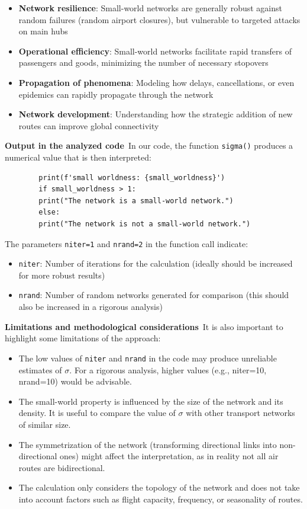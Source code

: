 \documentclass[12pt]{article}
\begin{document}
        \begin{itemize}
        \item \textbf{Network resilience}: Small-world networks are generally robust against random failures (random airport closures), but vulnerable to targeted attacks on main hubs
        \item \textbf{Operational efficiency}: Small-world networks facilitate rapid transfers of passengers and goods, minimizing the number of necessary stopovers
        \item \textbf{Propagation of phenomena}: Modeling how delays, cancellations, or even epidemics can rapidly propagate through the network
        \item \textbf{Network development}: Understanding how the strategic addition of new routes can improve global connectivity
        \end{itemize}
        \textbf{Output in the analyzed code}\
        In our code, the function \texttt{sigma()} produces a numerical value that is then interpreted:
        \begin{verbatim}
        print(f'small worldness: {small_worldness}')
        if small_worldness > 1:
        print("The network is a small-world network.")
        else:
        print("The network is not a small-world network.")
        \end{verbatim}
        The parameters \texttt{niter=1} and \texttt{nrand=2} in the function call indicate:
        \begin{itemize}
        \item \texttt{niter}: Number of iterations for the calculation (ideally should be increased for more robust results)
        \item \texttt{nrand}: Number of random networks generated for comparison (this should also be increased in a rigorous analysis)
        \end{itemize}
        \textbf{Limitations and methodological considerations}\
        It is also important to highlight some limitations of the approach:
        \begin{itemize}
        \item The low values of \texttt{niter} and \texttt{nrand} in the code may produce unreliable estimates of $\sigma$. For a rigorous analysis, higher values (e.g., niter=10, nrand=10) would be advisable.
        \item The small-world property is influenced by the size of the network and its density. It is useful to compare the value of $\sigma$ with other transport networks of similar size.
        \item The symmetrization of the network (transforming directional links into non-directional ones) might affect the interpretation, as in reality not all air routes are bidirectional.
        \item The calculation only considers the topology of the network and does not take into account factors such as flight capacity, frequency, or seasonality of routes.
        \end{itemize}
\end{document}
